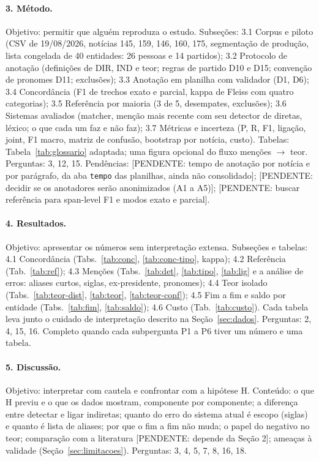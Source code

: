 \documentclass[11pt,a4paper]{article}
\newcommand{\pend}[1]{\textcolor{red!60!black}{[PENDENTE: #1]}}
\begin{document}
\paragraph{3. Método.}
Objetivo: permitir que alguém reproduza o estudo. Subseções: 3.1 Corpus e piloto (CSV de 19/08/2026, notícias 145, 159, 146, 160, 175, segmentação de produção, lista congelada de 40 entidades: 26 pessoas e 14 partidos); 3.2 Protocolo de anotação (definições de DIR, IND e teor; regras de partido D10 e D15; convenção de pronomes D11; exclusões); 3.3 Anotação em planilha com validador (D1, D6); 3.4 Concordância (F1 de trechos exato e parcial, kappa de Fleiss com quatro categorias); 3.5 Referência por maioria (3 de 5, desempates, exclusões); 3.6 Sistemas avaliados (matcher, menção mais recente com seu detector de diretas, léxico; o que cada um faz e não faz); 3.7 Métricas e incerteza (P, R, F1, ligação, joint, F1 macro, matriz de confusão, bootstrap por notícia, custo). Tabelas: Tabela~\ref{tab:glossario} adaptada; uma figura opcional do fluxo menções $\rightarrow$ teor. Perguntas: 3, 12, 15. Pendências: \pend{tempo de anotação por notícia e por parágrafo, da aba \texttt{tempo} das planilhas, ainda não consolidado}; \pend{decidir se os anotadores serão anonimizados (A1 a A5)}; \pend{buscar referência para span-level F1 e modos exato e parcial}.

\paragraph{4. Resultados.}
Objetivo: apresentar os números sem interpretação extensa. Subseções e tabelas: 4.1 Concordância (Tabs.~\ref{tab:conc}, \ref{tab:conc-tipo}, kappa); 4.2 Referência (Tab.~\ref{tab:ref}); 4.3 Menções (Tabs.~\ref{tab:det}, \ref{tab:tipo}, \ref{tab:lig} e a análise de erros: aliases curtos, siglas, ex-presidente, pronomes); 4.4 Teor isolado (Tabs.~\ref{tab:teor-dist}, \ref{tab:teor}, \ref{tab:teor-conf}); 4.5 Fim a fim e saldo por entidade (Tabs.~\ref{tab:fim}, \ref{tab:saldo}); 4.6 Custo (Tab.~\ref{tab:custo}). Cada tabela leva junto o cuidado de interpretação descrito na Seção~\ref{sec:dados}. Perguntas: 2, 4, 15, 16. Completo quando cada subpergunta P1 a P6 tiver um número e uma tabela.

\paragraph{5. Discussão.}
Objetivo: interpretar com cautela e confrontar com a hipótese H. Conteúdo: o que H previu e o que os dados mostram, componente por componente; a diferença entre detectar e ligar indiretas; quanto do erro do sistema atual é escopo (siglas) e quanto é lista de aliases; por que o fim a fim não muda; o papel do negativo no teor; comparação com a literatura \pend{depende da Seção 2}; ameaças à validade (Seção~\ref{sec:limitacoes}). Perguntas: 3, 4, 5, 7, 8, 16, 18.
\end{document}

